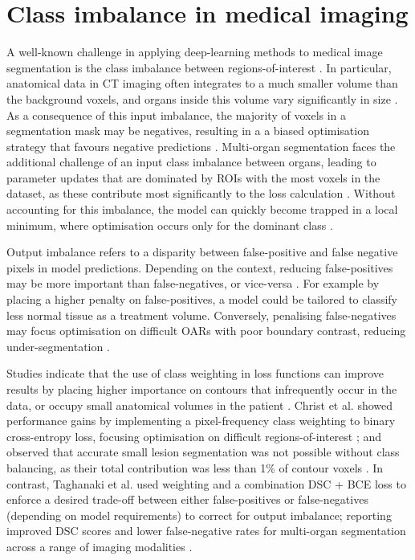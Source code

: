 \section{Class imbalance in medical imaging}
A well-known challenge in applying deep-learning methods to medical image segmentation is the class imbalance between regions-of-interest \cite{Hesamian2019}. In particular, anatomical data in CT imaging often integrates to a much smaller volume than the background voxels, and organs inside this volume vary significantly in size \cite{taghanaki2018}. As a consequence of this input imbalance, the majority of voxels in a segmentation mask may be negatives, resulting in a a biased optimisation strategy that favours negative predictions \cite{taghanaki2018}. Multi-organ segmentation faces the additional challenge of an input class imbalance between organs, leading to parameter updates that are dominated by ROIs with the most voxels in the dataset, as these contribute most significantly to the loss calculation \cite{Khan2019}. Without accounting for this imbalance, the model can quickly become trapped in a local minimum, where optimisation occurs only for the dominant class \cite{Khan2019}. 

Output imbalance refers to a disparity between false-positive and false negative pixels in model predictions. Depending on the context, reducing false-positives may be more important than false-negatives, or vice-versa \cite{taghanaki2018}. For example by placing a higher penalty on false-positives, a model could be tailored to classify less normal tissue as a treatment volume. Conversely, penalising false-negatives may focus optimisation on difficult OARs with poor boundary contrast, reducing under-segmentation \cite{taghanaki2018}.

Studies indicate that the use of class weighting in loss functions can improve results by placing higher importance on contours that infrequently occur in the data, or occupy small anatomical volumes in the patient \cite{taghanaki2018}. Christ et al. showed performance gains by implementing a pixel-frequency class weighting to binary cross-entropy loss, focusing optimisation on difficult regions-of-interest \cite{ferdin2017}; and observed that accurate small lesion segmentation was not possible without class balancing, as their total contribution was less than 1\% of contour voxels \cite{ferdin2017}. In contrast, Taghanaki et al. used weighting and a combination DSC + BCE loss to enforce a desired trade-off between either false-positives or false-negatives (depending on model requirements) to correct for output imbalance; reporting improved DSC scores and lower false-negative rates for multi-organ segmentation across a range of imaging modalities \cite{taghanaki2018}.

